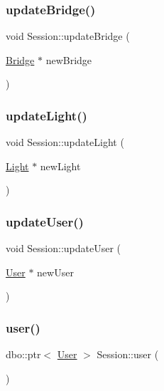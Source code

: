 \subsubsection{\texorpdfstring{update\+Bridge()}{updateBridge()}}
{\footnotesize\ttfamily void Session\+::update\+Bridge (\begin{DoxyParamCaption}\item[{\hyperlink{class_bridge}{Bridge} $\ast$}]{new\+Bridge }\end{DoxyParamCaption})}

\mbox{\label{class_session_af570bdb239adcc1e8b0c4951681cdcf4}} 
\subsubsection{\texorpdfstring{update\+Light()}{updateLight()}}
{\footnotesize\ttfamily void Session\+::update\+Light (\begin{DoxyParamCaption}\item[{\hyperlink{class_light}{Light} $\ast$}]{new\+Light }\end{DoxyParamCaption})}

\mbox{\label{class_session_a646f3f09d40303c6539c7bbacb93893e}} 
\subsubsection{\texorpdfstring{update\+User()}{updateUser()}}
{\footnotesize\ttfamily void Session\+::update\+User (\begin{DoxyParamCaption}\item[{\hyperlink{class_user}{User} $\ast$}]{new\+User }\end{DoxyParamCaption})}

\mbox{\label{class_session_a8869e1a43a0131699f9dc234c96b45c9}} 
\subsubsection{\texorpdfstring{user()}{user()}\hspace{0.1cm}{\footnotesize\ttfamily [1/2]}}
{\footnotesize\ttfamily dbo\+::ptr$<$ \hyperlink{class_user}{User} $>$ Session\+::user (\begin{DoxyParamCaption}{ }\end{DoxyParamCaption})}

